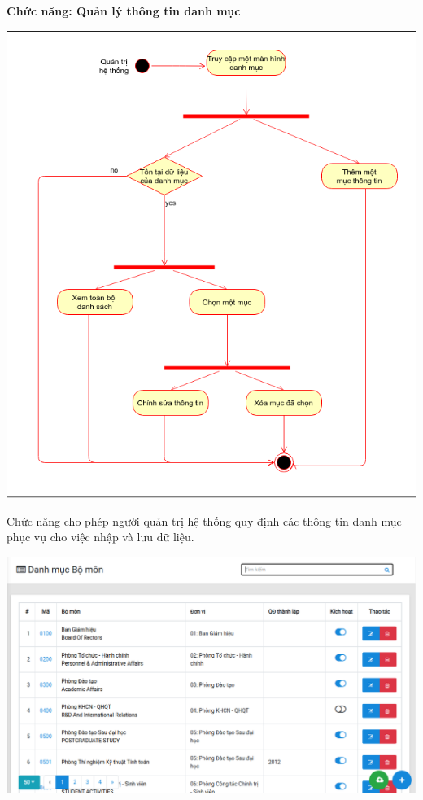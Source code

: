 \textbf{Chức năng: Quản lý thông tin danh mục}\\
\begin{center}
  \captionsetup{type=figure}
  \includegraphics[width=15cm]{img/UML/Admin/danhmucActivity.png}
\end{center}

Chức năng cho phép người quản trị hệ thống quy định các thông tin danh mục phục vụ cho việc nhập và lưu dữ liệu.\\
\begin{center}
  \captionsetup{type=figure}
  \includegraphics[width=15cm]{img/Screen/danhmuc.png}
\end{center}
